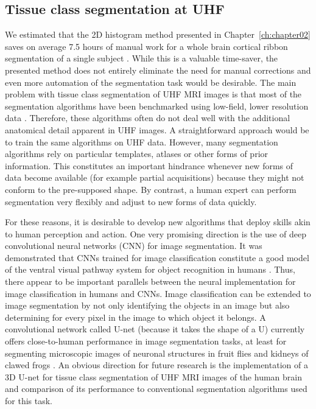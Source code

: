 \subsection{Tissue class segmentation at UHF}
We estimated that the 2D histogram method presented in Chapter~\ref{ch:chapter02} saves on average 7.5 hours of manual work for a whole brain cortical ribbon segmentation of a single subject \parencite{Gulban2018a}. While this is a valuable time-saver, the presented method does not entirely eliminate the need for manual corrections and even more automation of the segmentation task would be desirable. The main problem with tissue class segmentation of UHF MRI images is that most of the segmentation algorithms have been benchmarked using low-field, lower resolution data \parencite{Helms2016}. Therefore, these algorithms often do not deal well with the additional anatomical detail apparent in UHF images. A straightforward approach would be to train the same algorithms on UHF data. However, many segmentation algorithms \parencite{Ashburner2005, Bazin2014} rely on particular templates, atlases or other forms of prior information. This constitutes an important hindrance whenever new forms of data become available (for example partial acquisitions) because they might not conform to the pre-supposed shape. By contrast, a human expert can perform segmentation very flexibly and adjust to new forms of data quickly.

For these reasons, it is desirable to develop new algorithms that deploy skills akin to human perception and action. One very promising direction is the use of deep convolutional neural networks (CNN) for image segmentation. It was demonstrated that CNNs trained for image classification constitute a good model of the ventral visual pathway system for object recognition in humans \parencite{Kriegeskorte2014, Yamins2016}. Thus, there appear to be important parallels between the neural implementation for image classification in humans and CNNs. Image classification can be extended to image segmentation by not only identifying the objects in an image but also determining for every pixel in the image to which object it belongs. A convolutional network called U-net (because it takes the shape of a U) currently offers close-to-human performance in image segmentation tasks, at least for segmenting microscopic images of neuronal structures in fruit flies \parencite{Ronneberger2015} and kidneys of clawed frogs \parencite{Cicek2016}. An obvious direction for future research is the implementation of a 3D U-net for tissue class segmentation of UHF MRI images of the human brain and comparison of its performance to conventional segmentation algorithms used for this task.

